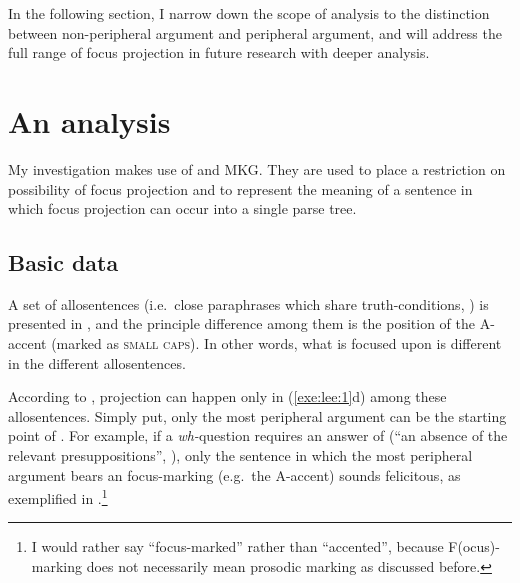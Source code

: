 In the following section, I narrow down the scope of analysis to the
distinction between non-peripheral argument and  peripheral
argument, and will address the full range of focus projection in
future research with deeper analysis.



\section{An analysis}
\label{10-4:sec:analysis}

My investigation makes use of  and MKG. They are used to place a restriction on
possibility of focus projection and to represent the meaning of a
sentence in which focus projection can occur into a single parse tree.


\subsection{Basic data}
\label{10-4:ssec:basic}

A set of allosentences (i.e.\ close paraphrases which share
truth-conditions, \citealt{lambrecht:96}) is presented in
, and the principle difference
among them is the position of the A-accent (marked as \textsc{small
  caps}). In other words, what is focused upon is
different in the different allosentences.





According to \citet{bresnan:71},  projection can happen
only in (\ref{exe:lee:1}d) among these allosentences. Simply put, only
the most peripheral argument can be the starting point of . For example, if a \textit{wh-}question requires an
answer of  (``an absence of the relevant
presuppositions'', \citealt[232]{lambrecht:96}), only the sentence in
which the most peripheral argument bears an focus-marking (e.g.\ the
A-accent) sounds felicitous, as exemplified in
.\footnote{I would rather say ``focus-marked'' rather
  than ``accented'', because F(ocus)-marking does not necessarily mean
  prosodic marking as discussed before.}


